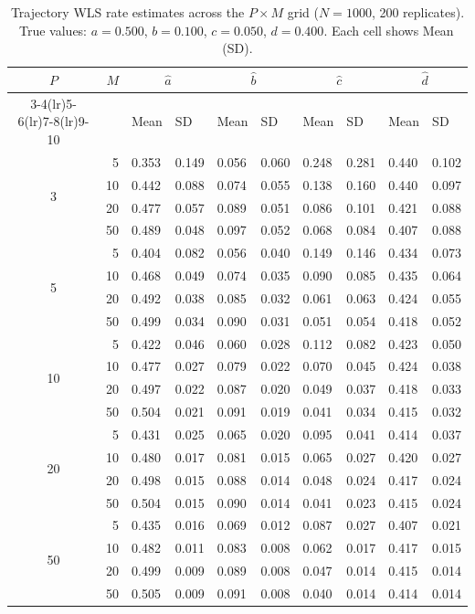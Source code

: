 \documentclass[12pt]{article}
\begin{document}
\begin{table}[H]
\centering
\small
\caption{Trajectory WLS rate estimates across the $P \times M$ grid
         ($N=1000$, 200 replicates).
         True values: $a=0.500$, $b=0.100$, $c=0.050$, $d=0.400$.
         Each cell shows Mean\,(SD).}
\label{tab:pm_rates}
\begin{tabular}{crllllllll}
\toprule
$P$ & $M$ &
  \multicolumn{2}{c}{$\hat{a}$} &
  \multicolumn{2}{c}{$\hat{b}$} &
  \multicolumn{2}{c}{$\hat{c}$} &
  \multicolumn{2}{c}{$\hat{d}$} \\
\cmidrule(lr){3-4}\cmidrule(lr){5-6}\cmidrule(lr){7-8}\cmidrule(lr){9-10}
& & Mean & SD & Mean & SD & Mean & SD & Mean & SD \\
\midrule
\multirow{4}{*}{3}
 &  5 & 0.353 & 0.149 & 0.056 & 0.060 & 0.248 & 0.281 & 0.440 & 0.102 \\
 & 10 & 0.442 & 0.088 & 0.074 & 0.055 & 0.138 & 0.160 & 0.440 & 0.097 \\
 & 20 & 0.477 & 0.057 & 0.089 & 0.051 & 0.086 & 0.101 & 0.421 & 0.088 \\
 & 50 & 0.489 & 0.048 & 0.097 & 0.052 & 0.068 & 0.084 & 0.407 & 0.088 \\
\midrule
\multirow{4}{*}{5}
 &  5 & 0.404 & 0.082 & 0.056 & 0.040 & 0.149 & 0.146 & 0.434 & 0.073 \\
 & 10 & 0.468 & 0.049 & 0.074 & 0.035 & 0.090 & 0.085 & 0.435 & 0.064 \\
 & 20 & 0.492 & 0.038 & 0.085 & 0.032 & 0.061 & 0.063 & 0.424 & 0.055 \\
 & 50 & 0.499 & 0.034 & 0.090 & 0.031 & 0.051 & 0.054 & 0.418 & 0.052 \\
\midrule
\multirow{4}{*}{10}
 &  5 & 0.422 & 0.046 & 0.060 & 0.028 & 0.112 & 0.082 & 0.423 & 0.050 \\
 & 10 & 0.477 & 0.027 & 0.079 & 0.022 & 0.070 & 0.045 & 0.424 & 0.038 \\
 & 20 & 0.497 & 0.022 & 0.087 & 0.020 & 0.049 & 0.037 & 0.418 & 0.033 \\
 & 50 & 0.504 & 0.021 & 0.091 & 0.019 & 0.041 & 0.034 & 0.415 & 0.032 \\
\midrule
\multirow{4}{*}{20}
 &  5 & 0.431 & 0.025 & 0.065 & 0.020 & 0.095 & 0.041 & 0.414 & 0.037 \\
 & 10 & 0.480 & 0.017 & 0.081 & 0.015 & 0.065 & 0.027 & 0.420 & 0.027 \\
 & 20 & 0.498 & 0.015 & 0.088 & 0.014 & 0.048 & 0.024 & 0.417 & 0.024 \\
 & 50 & 0.504 & 0.015 & 0.090 & 0.014 & 0.041 & 0.023 & 0.415 & 0.024 \\
\midrule
\multirow{4}{*}{50}
 &  5 & 0.435 & 0.016 & 0.069 & 0.012 & 0.087 & 0.027 & 0.407 & 0.021 \\
 & 10 & 0.482 & 0.011 & 0.083 & 0.008 & 0.062 & 0.017 & 0.417 & 0.015 \\
 & 20 & 0.499 & 0.009 & 0.089 & 0.008 & 0.047 & 0.014 & 0.415 & 0.014 \\
 & 50 & 0.505 & 0.009 & 0.091 & 0.008 & 0.040 & 0.014 & 0.414 & 0.014 \\
\bottomrule
\end{tabular}
\end{table}
\end{document}
